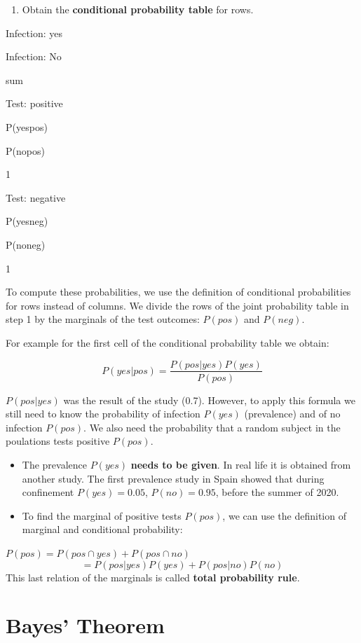 \documentclass[
]{book}
\providecommand{\tightlist}{%
  \setlength{\itemsep}{0pt}\setlength{\parskip}{0pt}}
\begin{document}
\begin{enumerate}
\def\labelenumi{\arabic{enumi}.}
\setcounter{enumi}{1}
\tightlist
\item
  Obtain the \textbf{conditional probability table} for rows.
\end{enumerate}

Infection: yes

Infection: No

sum

Test: positive

P(yes{\textbar{}}pos)

P(no{\textbar{}}pos)

1

Test: negative

P(yes{\textbar{}}neg)

P(no{\textbar{}}neg)

1

To compute these probabilities, we use the definition of conditional probabilities for rows instead of columns. We divide the rows of the joint probability table in step 1 by the marginals of the test outcomes: \(P(pos)\) and \(P(neg)\).

For example for the first cell of the conditional probability table we obtain:

\[P(yes| pos)= \frac{P(pos|yes)P(yes)}{P(pos)}\]

\(P(pos|yes)\) was the result of the study (0.7). However, to apply this formula we still need to know the probability of infection \(P(yes)\) (prevalence) and of no infection \(P(pos)\). We also need the probability that a random subject in the poulations tests positive \(P(pos)\).

\begin{itemize}
\item
  The prevalence \(P(yes)\) \textbf{needs to be given}. In real life it is obtained from another study. The first prevalence study in Spain showed that during confinement \(P(yes)=0.05\), \(P(no)=0.95\), before the summer of 2020.
\item
  To find the marginal of positive tests \(P(pos)\), we can use the definition of marginal and conditional probability:
\end{itemize}

\(P(pos)= P(pos \cap yes) + P(pos \cap no)\)
\[= P(pos| yes)P (yes)+P(pos|no)P(no)\]
This last relation of the marginals is called \textbf{total probability rule}.

\hypertarget{bayes-theorem}{%
\section{Bayes' Theorem}\label{bayes-theorem}}
\end{document}

